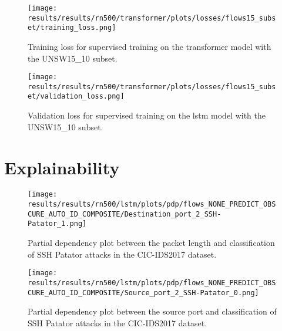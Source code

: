 











\begin{figure}[h]
	\centering
	\texttt{[image: results/results/rn500/transformer/plots/losses/flows15\_subset/training\_loss.png]}
	\caption{Training loss for supervised training on the transformer model with the UNSW15\_10 subset.}
	\label{fig:results:transformer:training_loss_flows15_subset}
\end{figure}

\begin{figure}[h]
	\centering
	\texttt{[image: results/results/rn500/transformer/plots/losses/flows15\_subset/validation\_loss.png]}
	\caption{Validation loss for supervised training on the \gls{lstm} model with the UNSW15\_10 subset.}
	\label{fig:results:transformer:validation_loss_flows15_subset}
\end{figure}


\section{Explainability}

\begin{figure}[h]
	\centering
	\texttt{[image: results/results/rn500/lstm/plots/pdp/flows\_NONE\_PREDICT\_OBSCURE\_AUTO\_ID\_COMPOSITE/Destination\_port\_2\_SSH-Patator\_1.png]}
	\caption{Partial dependency plot between the packet length and classification of SSH Patator attacks in the CIC-IDS2017 dataset.}
	\label{fig:results:lstm:pdp:cic17_destination_port_ssh_patator}
\end{figure}

\begin{figure}[h]
	\centering
	\texttt{[image: results/results/rn500/lstm/plots/pdp/flows\_NONE\_PREDICT\_OBSCURE\_AUTO\_ID\_COMPOSITE/Source\_port\_2\_SSH-Patator\_0.png]}
	\caption{Partial dependency plot between the source port and classification of SSH Patator attacks in the CIC-IDS2017 dataset.}
	\label{fig:results:lstm:pdp:cic17_source_port_ssh_patator}
\end{figure}

